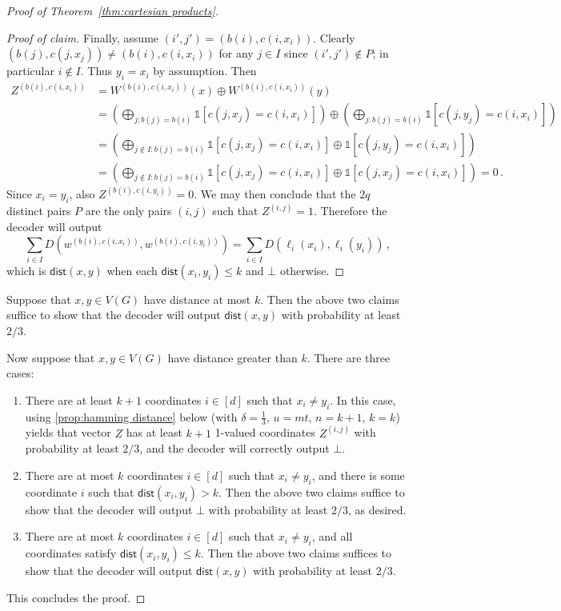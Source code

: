 \documentclass{article}
\newcommand{\dist}{\mathsf{dist}}
\newcommand{\ind}[1]{\mathds{1} \left[ #1 \right] }
\begin{document}
\begin{proof}[Proof of Theorem~\ref{thm:cartesian products}]
\begin{proof}[Proof of claim]
Finally, assume $(i',j') = (b(i),c(i,x_i))$.
Clearly $(b(j),c(j,x_j)) \neq (b(i),c(i,x_i))$ for any $j \in I$ since $(i',j') \notin P$;
in particular $i \notin I$. Thus $y_i = x_i$ by assumption.
Then
\begin{align*}
  Z^{(b(i), c(i,x_i))}
  &= W^{(b(i), c(i,x_i))}(x) \oplus W^{(b(i), c(i,x_i))}(y) \\
  &= \left( \bigoplus_{j : b(j)=b(i)} \ind{c(j,x_j)=c(i,x_i)} \right) \oplus
     \left( \bigoplus_{j : b(j)=b(i)} \ind{c(j,y_j)=c(i,x_i)} \right) \\
  &= \left( \bigoplus_{j \notin I: b(j)=b(i)} \ind{c(j,x_j)=c(i,x_i)}
      \oplus \ind{c(j,y_j)=c(i,x_i)} \right) \\
  &= \left( \bigoplus_{j \notin I: b(j)=b(i)} \ind{c(j,x_j)=c(i,x_i)}
      \oplus \ind{c(j,x_j)=c(i,x_i)} \right) = 0 \,.
\end{align*}
Since $x_i=y_i$, also $Z^{(b(i), c(i,y_i))}=0$. We may then conclude that the $2q$ distinct
pairs $P$ are the only pairs $(i,j)$ such that $Z^{(i,j)}=1$. Therefore the decoder will output
\[
  \sum_{i \in I} D\left( w^{(b(i),c(i,x_i))}, w^{(b(i),c(i,y_i))} \right)
  = \sum_{i \in I} D\left( \ell_i(x_i), \ell_i(y_i) \right) \,,
\]
which is $\dist(x,y)$ when each $\dist(x_i,y_i) \leq k$ and $\bot$ otherwise.
\end{proof}
Suppose that $x,y \in V(G)$ have distance at most $k$. Then the above two claims suffice to show
that the decoder will output $\dist(x,y)$ with probability at least $2/3$.

Now suppose that $x,y \in V(G)$ have distance greater than $k$. There are three cases:
\begin{enumerate}
\item There are at least $k+1$ coordinates $i \in [d]$ such that $x_i \neq y_i$. In this case, using
\cref{prop:hamming distance} below (with $\delta=\frac13$, $u=mt$, $n=k+1$, $k=k$) yields
that vector $Z$ has at least $k+1$ 1-valued coordinates
$Z^{(i,j)}$ with probability at least $2/3$, and the decoder will correctly output $\bot$.
\item There are at most $k$ coordinates $i \in [d]$ such that $x_i \neq y_i$, and there is some
coordinate $i$ such that $\dist(x_i,y_i) > k$. Then the above two claims suffice to show that the
decoder will output $\bot$ with probability at least $2/3$, as desired.
\item There are at most $k$ coordinates $i \in [d]$ such that $x_i \neq y_i$, and all coordinates
satisfy $\dist(x_i,y_i) \leq k$. Then the above two claims suffices to show that the decoder will
output $\dist(x,y)$ with probability at least $2/3$.
\end{enumerate}
This concludes the proof.
\end{proof}
\end{document}
